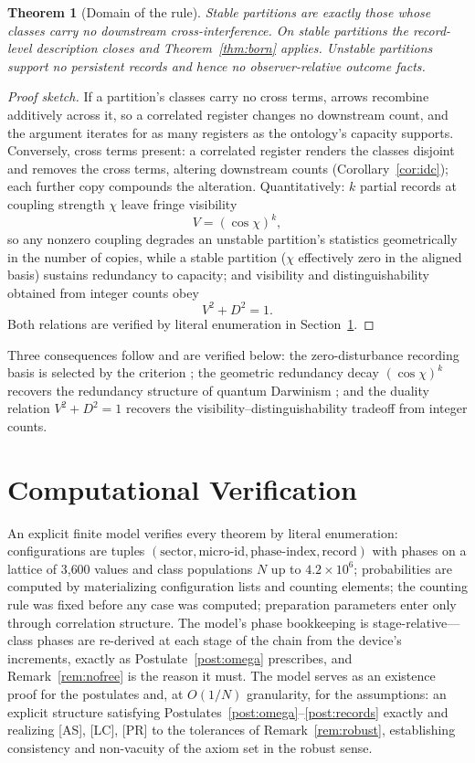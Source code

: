 \documentclass[11pt]{article}
\newtheorem{theorem}{Theorem}
\theoremstyle{definition}
\theoremstyle{remark}
\begin{document}
\begin{theorem}[Domain of the rule]\label{thm:scope}
Stable partitions are exactly those whose classes carry no downstream cross-interference. On stable partitions the record-level description closes and Theorem~\ref{thm:born} applies. Unstable partitions support no persistent records and hence no observer-relative outcome facts.
\end{theorem}
\begin{proof}[Proof sketch]
If a partition's classes carry no cross terms, arrows recombine additively across it, so a correlated register changes no downstream count, and the argument iterates for as many registers as the ontology's capacity supports. Conversely, cross terms present: a correlated register renders the classes disjoint and removes the cross terms, altering downstream counts (Corollary~\ref{cor:idc}); each further copy compounds the alteration. Quantitatively: $k$ partial records at coupling strength $\chi$ leave fringe visibility
\[ V = (\cos\chi)^k, \]
so any nonzero coupling degrades an unstable partition's statistics geometrically in the number of copies, while a stable partition ($\chi$ effectively zero in the aligned basis) sustains redundancy to capacity; and visibility and distinguishability obtained from integer counts obey
\[ V^2 + D^2 = 1. \]
Both relations are verified by literal enumeration in Section~\ref{sec:verif}.
\end{proof}

Three consequences follow and are verified below: the zero-disturbance recording basis is selected by the criterion \cite{Zurek2003}; the geometric redundancy decay $(\cos\chi)^k$ recovers the redundancy structure of quantum Darwinism \cite{Zurek2009}; and the duality relation $V^2 + D^2 = 1$ recovers the visibility--distinguishability tradeoff \cite{WoottersZurek1979,Englert1996} from integer counts.

\section{Computational Verification}\label{sec:verif}
An explicit finite model verifies every theorem by literal enumeration: configurations are tuples $(\text{sector}, \text{micro-id}, \text{phase-index}, \text{record})$ with phases on a lattice of 3{,}600 values and class populations $N$ up to $4.2 \times 10^6$; probabilities are computed by materializing configuration lists and counting elements; the counting rule was fixed before any case was computed; preparation parameters enter only through correlation structure. The model's phase bookkeeping is stage-relative---class phases are re-derived at each stage of the chain from the device's increments, exactly as Postulate~\ref{post:omega} prescribes, and Remark~\ref{rem:nofree} is the reason it must. The model serves as an existence proof for the postulates and, at $O(1/N)$ granularity, for the assumptions: an explicit structure satisfying Postulates~\ref{post:omega}--\ref{post:records} exactly and realizing [AS], [LC], [PR] to the tolerances of Remark~\ref{rem:robust}, establishing consistency and non-vacuity of the axiom set in the robust sense.
\end{document}
